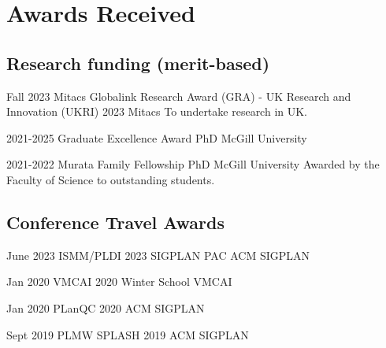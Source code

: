 \section{Awards Received}

    \subsection{Research funding (merit-based)}
    
    \cventry
        {Fall 2023}
        {Mitacs Globalink Research Award (GRA) - UK Research and Innovation (UKRI) 2023}
        {Mitacs}
        {}
        {}
        {
            To undertake research in UK.
        }

    \cventry
        {2021-2025}
        {Graduate Excellence Award}
        {PhD}
        {McGill University}
        {}
        {}

    \cventry
        {2021-2022}
        {Murata Family Fellowship}
        {PhD}
        {McGill University}
        {}
        {
            Awarded by the Faculty of Science to outstanding students.
        }

    \subsection{Conference Travel Awards}

    \cventry
        {June 2023}
        {ISMM/PLDI 2023 SIGPLAN PAC}
        {ACM SIGPLAN}
        {}
        {}
        {}

    \cventry
        {Jan 2020}
        {VMCAI 2020 Winter School}
        {VMCAI}
        {}
        {}
        {}
    
    \cventry
        {Jan 2020}
        {PLanQC 2020}
        {ACM SIGPLAN}
        {}
        {}
        {}

    \cventry
        {Sept 2019}
        {PLMW SPLASH 2019}
        {ACM SIGPLAN}
        {}
        {}
        {}

    
    
    